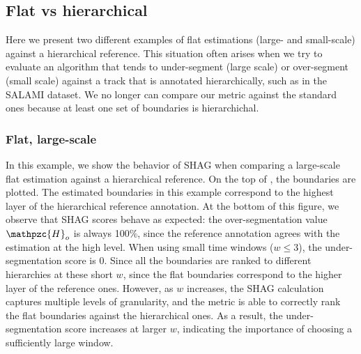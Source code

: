 \documentclass{article}
\def\shag{\ensuremath{\mathpzc{H}}}
\begin{document}
\subsection{Flat vs hierarchical}

Here we present two different examples of flat estimations (large- and small-scale) against a hierarchical reference.
This situation often arises when we try to evaluate an algorithm that tends to under-segment (large scale) or over-segment (small scale) against a track that is annotated
hierarchically, such as in the SALAMI dataset.
We no longer can compare our metric against the standard ones because at least one set of boundaries is hierarchichal.

\subsubsection{Flat, large-scale}

In this example, we show the behavior of SHAG when comparing a large-scale flat estimation against a hierarchical reference.
On the top of , the boundaries are plotted.
The estimated boundaries in this example correspond to the highest layer of the hierarchical reference annotation.
At the bottom of this figure, we observe that SHAG scores behave as expected: the over-segmentation value $\shag_o$ is always 100\%, since the reference annotation agrees with the
estimation at the high level.
When using small time windows ($w \leq 3$), the under-segmentation score is 0. Since all the boundaries are ranked to different hierarchies at these short $w$, since the flat boundaries correspond to the higher layer of the reference ones.
However, as $w$ increases, the SHAG calculation captures multiple levels of granularity, and the metric is able to correctly rank the flat boundaries against the hierarchical ones.
As a result, the under-segmentation score increases at larger $w$, indicating the importance of choosing a sufficiently large window.
\end{document}
